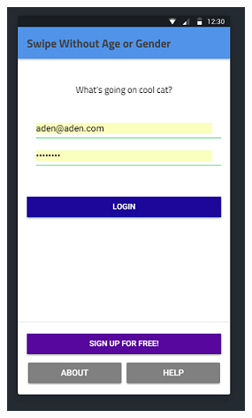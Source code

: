 \documentclass[a4paper, 11pt]{article}
\begin{document}
\begin{figure}
\centering
\begin{minipage}{.55\textwidth}
  \centering
  \includegraphics[width=.7\linewidth]{coolcolor.png}
  \label{fig:test1}
\end{minipage}%
\begin{minipage}{.55\textwidth}
  \centering
\captionsetup{format=hang}

\end{minipage}
\end{figure}
\end{document}
